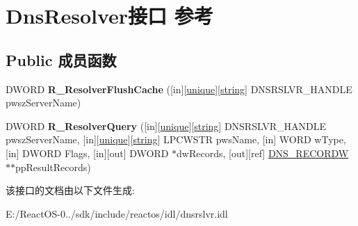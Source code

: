 \hypertarget{interface_dns_resolver}{}\section{Dns\+Resolver接口 参考}
\label{interface_dns_resolver}
\subsection*{Public 成员函数}
\begin{DoxyCompactItemize}
\item 
\mbox{\label{interface_dns_resolver_ab734bdbdddabc967a50f3aaf651e9fb4}} 
D\+W\+O\+RD {\bfseries R\+\_\+\+Resolver\+Flush\+Cache} (\mbox{[}in\mbox{]}\mbox{[}\hyperlink{interfaceunique}{unique}\mbox{]}\mbox{[}\hyperlink{structstring}{string}\mbox{]} D\+N\+S\+R\+S\+L\+V\+R\+\_\+\+H\+A\+N\+D\+LE pwsz\+Server\+Name)
\item 
\mbox{\label{interface_dns_resolver_aba99de3eaec99b485ae724d2b0d6fc09}} 
D\+W\+O\+RD {\bfseries R\+\_\+\+Resolver\+Query} (\mbox{[}in\mbox{]}\mbox{[}\hyperlink{interfaceunique}{unique}\mbox{]}\mbox{[}\hyperlink{structstring}{string}\mbox{]} D\+N\+S\+R\+S\+L\+V\+R\+\_\+\+H\+A\+N\+D\+LE pwsz\+Server\+Name, \mbox{[}in\mbox{]}\mbox{[}\hyperlink{interfaceunique}{unique}\mbox{]}\mbox{[}\hyperlink{structstring}{string}\mbox{]} L\+P\+C\+W\+S\+TR pws\+Name, \mbox{[}in\mbox{]} W\+O\+RD w\+Type, \mbox{[}in\mbox{]} D\+W\+O\+RD Flags, \mbox{[}in\mbox{]}\mbox{[}out\mbox{]} D\+W\+O\+RD $\ast$dw\+Records, \mbox{[}out\mbox{]}\mbox{[}ref\mbox{]} \hyperlink{struct___dns_record_w}{D\+N\+S\+\_\+\+R\+E\+C\+O\+R\+DW} $\ast$$\ast$pp\+Result\+Records)
\end{DoxyCompactItemize}


该接口的文档由以下文件生成\+:\begin{DoxyCompactItemize}
\item 
E\+:/\+React\+O\+S-\/0../sdk/include/reactos/idl/dnsrslvr.\+idl\end{DoxyCompactItemize}

